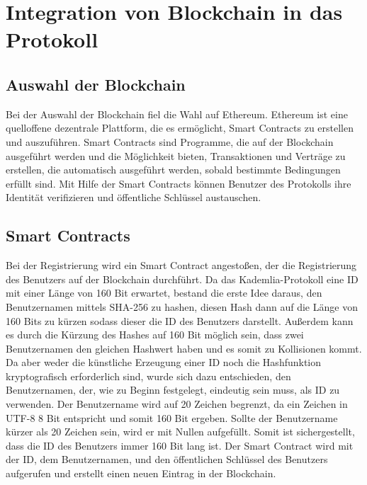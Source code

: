 \section{Integration von Blockchain in das Protokoll}
\label{sec:blockchainintegration}


\subsection{Auswahl der Blockchain}

Bei der Auswahl der Blockchain fiel die Wahl auf Ethereum. Ethereum ist eine quelloffene dezentrale Plattform, die es ermöglicht, Smart Contracts zu erstellen und auszuführen. Smart Contracts sind Programme, die auf der Blockchain ausgeführt werden und die Möglichkeit bieten, Transaktionen und Verträge zu erstellen, die automatisch ausgeführt werden, sobald bestimmte Bedingungen erfüllt sind. Mit Hilfe der Smart Contracts können Benutzer des Protokolls ihre Identität verifizieren und öffentliche Schlüssel austauschen. 









\subsection{Smart Contracts}
Bei der Registrierung wird ein Smart Contract angestoßen, der die Registrierung des Benutzers auf der Blockchain durchführt. Da das Kademlia-Protokoll eine ID mit einer Länge von 160 Bit erwartet, bestand die erste Idee daraus, den Benutzernamen mittels SHA-256 zu hashen, diesen Hash dann auf die Länge von 160 Bits zu kürzen sodass dieser die ID des Benutzers darstellt. Außerdem kann es durch die Kürzung des Hashes auf 160 Bit möglich sein, dass zwei Benutzernamen den gleichen Hashwert haben und es somit zu Kollisionen kommt.
Da aber weder die künstliche Erzeugung einer ID noch die Hashfunktion kryptografisch erforderlich sind, wurde sich dazu entschieden, den Benutzernamen, der, wie zu Beginn festgelegt, eindeutig sein muss, als ID zu verwenden. Der Benutzername wird auf 20 Zeichen begrenzt, da ein Zeichen in UTF-8 8 Bit entspricht und somit 160 Bit ergeben. Sollte der Benutzername kürzer als 20 Zeichen sein, wird er mit Nullen aufgefüllt. Somit ist sichergestellt, dass die ID des Benutzers immer 160 Bit lang ist. Der Smart Contract wird mit der ID, dem Benutzernamen, und den öffentlichen Schlüssel des Benutzers aufgerufen und erstellt einen neuen Eintrag in der Blockchain.

